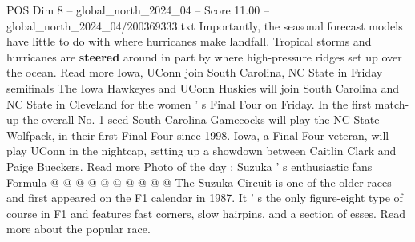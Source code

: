 \begin{textsample}{POS Dim 8 – global\_north\_2024\_04 – Score 11.00 – global\_north\_2024\_04/200369333.txt}
Importantly, the seasonal forecast models have little to do with where hurricanes make landfall.
Tropical storms and hurricanes are \textbf{steered} around in part by where high-pressure ridges set up over the ocean.
Read more Iowa, UConn join South Carolina, NC State in Friday semifinals The Iowa Hawkeyes and UConn Huskies will join South Carolina and NC State in Cleveland for the women ' s Final Four on Friday.
In the first match-up the overall No. 1 seed South Carolina Gamecocks will play the NC State Wolfpack, in their first Final Four since 1998.
Iowa, a Final Four veteran, will play UConn in the nightcap, setting up a showdown between Caitlin Clark and Paige Bueckers.
Read more Photo of the day : Suzuka ' s enthusiastic fans Formula @ @ @ @ @ @ @ @ @ @ The Suzuka Circuit is one of the older races and first appeared on the F1 calendar in 1987.
It ' s the only figure-eight type of course in F1 and features fast corners, slow hairpins, and a section of esses.
Read more about the popular race.

\end{textsample}

